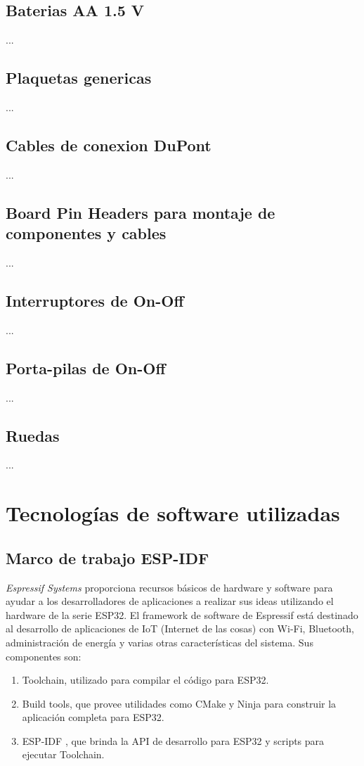 \subsection{Baterias AA 1.5 V}
...

\subsection{Plaquetas genericas}
...

\subsection{Cables de conexion DuPont}
...

\subsection{Board Pin Headers para montaje de componentes y cables}
...

\subsection{Interruptores de On-Off}
...

\subsection{Porta-pilas de On-Off}
...

\subsection{Ruedas}
...


\section{Tecnologías de software utilizadas} 

\subsection{Marco de trabajo ESP-IDF}

\textit{Espressif Systems} proporciona recursos básicos de hardware y software para ayudar a los desarrolladores de aplicaciones a realizar sus ideas utilizando el hardware de la serie ESP32. El framework de software de Espressif está destinado al desarrollo de aplicaciones de IoT (Internet de las cosas) con Wi-Fi, Bluetooth, administración de energía y varias otras características del sistema.
Sus componentes son:
\begin{enumerate}
	\item Toolchain, utilizado para compilar el código para ESP32.
	\item Build tools, que provee utilidades como CMake \cite{cmake_website} y Ninja \cite{ninja_website} para construir la aplicación completa para ESP32.
	\item ESP-IDF \cite{ESPIDF_home}, que brinda la API de desarrollo para ESP32 y scripts para ejecutar Toolchain.
	
\end{enumerate}

